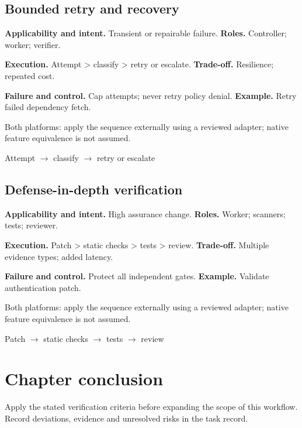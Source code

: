 \subsection{Bounded retry and recovery}

\textbf{Applicability and intent.} Transient or repairable failure. \textbf{Roles.} Controller; worker; verifier.

\textbf{Execution.} Attempt > classify > retry or escalate. \textbf{Trade-off.} Resilience; repeated cost.

\textbf{Failure and control.} Cap attempts; never retry policy denial. \textbf{Example.} Retry failed dependency fetch.

Both platforms: apply the sequence externally using a reviewed adapter; native feature equivalence is not assumed.

\begin{center}\small \textsf{Attempt} $\rightarrow$ \textsf{classify} $\rightarrow$ \textsf{retry or escalate}\end{center}

\subsection{Defense-in-depth verification}

\textbf{Applicability and intent.} High assurance change. \textbf{Roles.} Worker; scanners; tests; reviewer.

\textbf{Execution.} Patch > static checks > tests > review. \textbf{Trade-off.} Multiple evidence types; added latency.

\textbf{Failure and control.} Protect all independent gates. \textbf{Example.} Validate authentication patch.

Both platforms: apply the sequence externally using a reviewed adapter; native feature equivalence is not assumed.

\begin{center}\small \textsf{Patch} $\rightarrow$ \textsf{static checks} $\rightarrow$ \textsf{tests} $\rightarrow$ \textsf{review}\end{center}

\section{Chapter conclusion}

Apply the stated verification criteria before expanding the scope of this workflow. Record deviations, evidence and unresolved risks in the task record.
